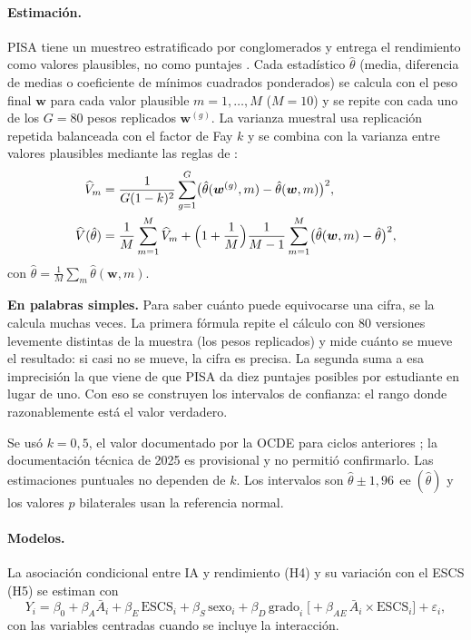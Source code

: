 \documentclass[11pt,a4paper]{article}
\newcommand{\V}{\widehat{V}}
\newcommand{\ee}{\operatorname{ee}}
\begin{document}
\paragraph{Estimación.} PISA tiene un muestreo estratificado por conglomerados y entrega el rendimiento como valores plausibles, no como puntajes \parencite{mislevy1992}. Cada estadístico $\hat\theta$ (media, diferencia de medias o coeficiente de mínimos cuadrados ponderados) se calcula con el peso final $\bm{w}$ para cada valor plausible $m=1,\dots,M$ ($M=10$) y se repite con cada uno de los $G=80$ pesos replicados $\bm{w}^{(g)}$. La varianza muestral usa replicación repetida balanceada con el factor de Fay $k$ \parencite{judkins1990} y se combina con la varianza entre valores plausibles mediante las reglas de \textcite{rubin1987}:
\begin{align}
\V_m&=\frac{1}{G(1-k)^2}\sum_{g=1}^{G}\bigl(\hat\theta(\bm{w}^{(g)},m)-\hat\theta(\bm{w},m)\bigr)^2, \label{eq:fay}\\
\V(\hat\theta)&=\frac1M\sum_{m=1}^{M}\V_m+\Bigl(1+\frac1M\Bigr)\frac{1}{M-1}\sum_{m=1}^{M}\bigl(\hat\theta(\bm{w},m)-\hat\theta\bigr)^2, \label{eq:var}
\end{align}
con $\hat\theta=\tfrac1M\sum_m\hat\theta(\bm{w},m)$.

\begin{explica}
\textbf{En palabras simples.} Para saber cuánto puede equivocarse una cifra, se la calcula muchas veces. La primera fórmula repite el cálculo con 80 versiones levemente distintas de la muestra (los pesos replicados) y mide cuánto se mueve el resultado: si casi no se mueve, la cifra es precisa. La segunda suma a esa imprecisión la que viene de que PISA da diez puntajes posibles por estudiante en lugar de uno. Con eso se construyen los intervalos de confianza: el rango donde razonablemente está el valor verdadero.
\end{explica}

\noindent Se usó $k=0{,}5$, el valor documentado por la OCDE para ciclos anteriores \parencite{oecd2009manual}; la documentación técnica de 2025 es provisional y no permitió confirmarlo. Las estimaciones puntuales no dependen de $k$. Los intervalos son $\hat\theta\pm1{,}96\,\ee(\hat\theta)$ y los valores $p$ bilaterales usan la referencia normal.

\paragraph{Modelos.} La asociación condicional entre IA y rendimiento (H4) y su variación con el ESCS (H5) se estiman con
\begin{equation}\label{eq:h4}
Y_i=\beta_0+\beta_A \bar A_i+\beta_E\,\text{ESCS}_i+\beta_S\,\text{sexo}_i+\beta_D\,\text{grado}_i\;\bigl[+\beta_{AE}\,\bar A_i\times\text{ESCS}_i\bigr]+\varepsilon_i ,
\end{equation}
con las variables centradas cuando se incluye la interacción.
\end{document}
